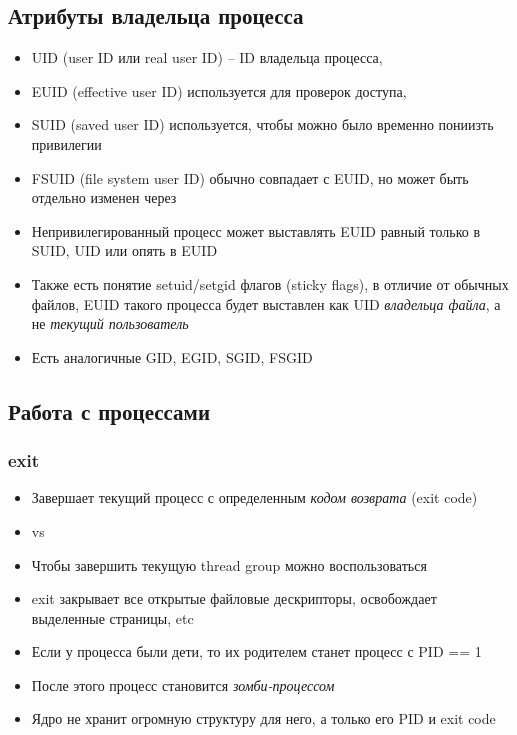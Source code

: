   \subsection{Атрибуты владельца процесса}
    \begin{itemize}
      \item UID (user ID или real user ID) -- ID владельца процесса, 
      \item EUID (effective user ID) используется для проверок доступа, 
      \item SUID (saved user ID) используется, чтобы можно было временно пониизть привилегии
      \item FSUID (file system user ID) обычно совпадает с EUID, но может быть отдельно изменен через 
      \item Непривилегированный процесс может выставлять EUID равный только в SUID, UID или опять в EUID
      \item Также есть понятие setuid/setgid флагов (sticky flags), в отличие от обычных файлов, EUID такого процесса будет выставлен как UID \textit{владельца файла}, а не \textit{текущий пользователь}
      \item Есть аналогичные GID, EGID, SGID, FSGID
    \end{itemize}
  
  \subsection{Работа с процессами}
  \subsubsection{exit}
    \begin{itemize}
      \item Завершает текущий процесс с определенным \textit{кодом возврата} (exit code)
      \item {} vs 
      \item Чтобы завершить текущую thread group можно воспользоваться 
      \item exit закрывает все открытые файловые дескрипторы, освобождает выделенные страницы, etc
      \item Если у процесса были дети, то их родителем станет процесс с PID == 1
      \item После этого процесс становится \textit{зомби-процессом}
      \item Ядро не хранит огромную структуру для него, а только его PID и exit code
    \end{itemize}
  
